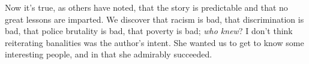 Now it's true, as others have noted, that the story is predictable and
that no great lessons are imparted. We discover that racism is bad, that
discrimination is bad, that police brutality is bad, that poverty is
bad; \emph{who knew}? I don't think reiterating banalities was the
author's intent. She wanted us to get to know some interesting people,
and in that she admirably succeeded.


%
 
